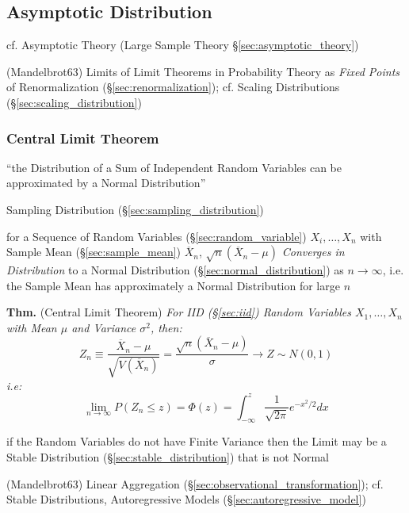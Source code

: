 \subsection{Asymptotic Distribution}\label{sec:asymptotic_distribution}

\fist cf. Asymptotic Theory (Large Sample Theory \S\ref{sec:asymptotic_theory})

(Mandelbrot63) Limits of Limit Theorems in Probability Theory as \emph{Fixed
  Points} of Renormalization (\S\ref{sec:renormalization}); cf. Scaling
Distributions (\S\ref{sec:scaling_distribution})



\subsubsection{Central Limit Theorem}\label{sec:central_limit}

``the Distribution of a Sum of Independent Random Variables can be approximated
by a Normal Distribution''

\fist Sampling Distribution (\S\ref{sec:sampling_distribution})

for a Sequence of Random Variables (\S\ref{sec:random_variable})
$X_i, \ldots, X_n$ with Sample Mean (\S\ref{sec:sample_mean})
$\overline{X}_n$, $\sqrt{n}(\overline{X}_n - \mu)$
\emph{Converges in Distribution} to a Normal Distribution
(\S\ref{sec:normal_distribution}) as $n \to \infty$, i.e. the Sample
Mean has approximately a Normal Distribution for large $n$

\textbf{Thm.} (Central Limit Theorem) \emph{For IID (\S\ref{sec:iid}) Random
  Variables $X_1, \ldots, X_n$ with Mean $\mu$ and Variance $\sigma^2$, then:
  \[
    Z_n \equiv \frac{\overline{X}_n - \mu}{\sqrt{V(\overline{X}_n)}} =
      \frac{\sqrt{n}(\overline{X}_n - \mu)}{\sigma} \to Z \sim N(0,1)
  \]
  i.e:
  \[
    \lim_{n\to\infty} P(Z_n \leq z) = \Phi(z) =
      \int_{-\infty}^z \frac{1}{\sqrt{2\pi}}e^{-x^2/2} dx
  \]
}

\fist if the Random Variables do not have Finite Variance then the Limit may be
a Stable Distribution (\S\ref{sec:stable_distribution}) that is not Normal

(Mandelbrot63) Linear Aggregation (\S\ref{sec:observational_transformation});
cf. Stable Distributions, Autoregressive Models
(\S\ref{sec:autoregressive_model})


